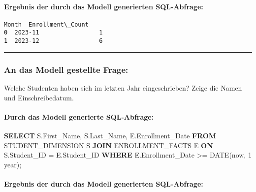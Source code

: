 \documentclass[11pt]{article}
\newenvironment{Shaded}{}{}
\newcommand{\KeywordTok}[1]{\textcolor[rgb]{0.00,0.44,0.13}{\textbf{{#1}}}}
\newcommand{\DataTypeTok}[1]{\textcolor[rgb]{0.56,0.13,0.00}{{#1}}}
\newcommand{\StringTok}[1]{\textcolor[rgb]{0.25,0.44,0.63}{{#1}}}
\newcommand{\NormalTok}[1]{{#1}}
\newcommand{\OperatorTok}[1]{\textcolor[rgb]{0.40,0.40,0.40}{{#1}}}
\begin{document}
    
    \hypertarget{ergebnis-der-durch-das-modell-generierten-sql-abfrage}{%
\paragraph{Ergebnis der durch das Modell generierten
SQL-Abfrage:}\label{ergebnis-der-durch-das-modell-generierten-sql-abfrage}}

    
    
    \begin{Verbatim}[commandchars=\\\{\}]
     Month  Enrollment\_Count
0  2023-11                 1
1  2023-12                 6
    \end{Verbatim}

    
    \begin{center}\rule{0.5\linewidth}{0.5pt}\end{center}

    
    \hypertarget{an-das-modell-gestellte-frage}{%
\subsubsection{An das Modell gestellte
Frage:}\label{an-das-modell-gestellte-frage}}

Welche Studenten haben sich im letzten Jahr eingeschrieben? Zeige die
Namen und Einschreibedatum.

    
    \hypertarget{durch-das-modell-generierte-sql-abfrage}{%
\paragraph{Durch das Modell generierte
SQL-Abfrage:}\label{durch-das-modell-generierte-sql-abfrage}}

\begin{Shaded}
\begin{Highlighting}[]
\KeywordTok{SELECT}\NormalTok{ S.First\_Name, S.Last\_Name, E.Enrollment\_Date }
\KeywordTok{FROM}\NormalTok{ STUDENT\_DIMENSION S }
\KeywordTok{JOIN}\NormalTok{ ENROLLMENT\_FACTS E }\KeywordTok{ON}\NormalTok{ S.Student\_ID }\OperatorTok{=}\NormalTok{ E.Student\_ID }
\KeywordTok{WHERE}\NormalTok{ E.Enrollment\_Date }\OperatorTok{\textgreater{}=} \DataTypeTok{DATE}\NormalTok{(}\StringTok{\textquotesingle{}now\textquotesingle{}}\NormalTok{, }\StringTok{\textquotesingle{}{-}1 year\textquotesingle{}}\NormalTok{);}
\end{Highlighting}
\end{Shaded}

    
    \hypertarget{ergebnis-der-durch-das-modell-generierten-sql-abfrage}{%
\paragraph{Ergebnis der durch das Modell generierten
SQL-Abfrage:}\label{ergebnis-der-durch-das-modell-generierten-sql-abfrage}}
\end{document}
